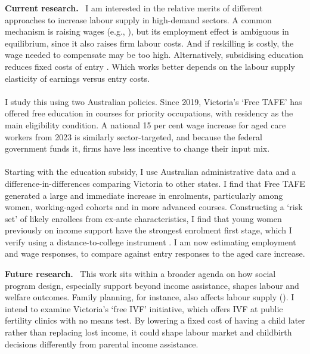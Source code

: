 \documentclass[11pt]{article}
\newcommand{\shead}[1]{\par\vspace{0.85em}\noindent\textbf{#1.}\ }
\begin{document}
\shead{Current research} I am interested in the relative merits of different approaches to increase labour supply in high-demand sectors. A common mechanism is raising wages (e.g., \cite{dalbo_finan_rossi2013}), but its employment effect is ambiguous in equilibrium, since it also raises firm labour costs. And if reskilling is costly, the wage needed to compensate may be too high. Alternatively, subsidising education reduces fixed costs of entry \citep{schoonover2026}. Which works better depends on the labour supply elasticity of earnings versus entry costs. \\~\\I study this using two Australian policies. Since 2019, Victoria's `Free TAFE' has offered free education in courses for priority occupations, with residency as the main eligibility condition. A national 15 per cent wage increase for aged care workers from 2023 \citep{fwc_agedcare2022} is similarly sector-targeted, and because the federal government funds it, firms have less incentive to change their input mix. \\~\\Starting with the education subsidy, I use Australian administrative data and a difference-in-differences comparing Victoria to other states. I find that Free TAFE generated a large and immediate increase in enrolments, particularly among women, working-aged cohorts and in more advanced courses. Constructing a `risk set' of likely enrollees from ex-ante characteristics, I find that young women previously on income support have the strongest enrolment first stage, which I verify using a distance-to-college instrument \citep{card1995}. I am now estimating employment and wage responses, to compare against entry responses to the aged care increase.

\shead{Future research} This work sits within a broader agenda on how social program design, especially support beyond income assistance, shapes labour and welfare outcomes. Family planning, for instance, also affects labour supply (\cite{gallen2026}). I intend to examine Victoria's `free IVF' initiative, which offers IVF at public fertility clinics with no means test. By lowering a fixed cost of having a child later rather than replacing lost income, it could shape labour market and childbirth decisions differently from parental income assistance.


\end{document}
